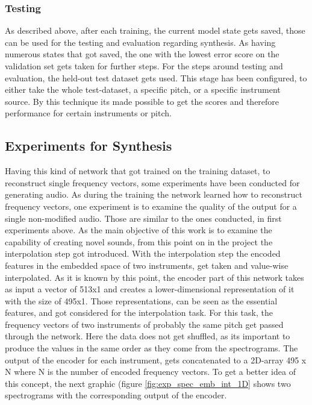 \subsubsection{Testing}
As described above, after each training, the current model state gets saved, those can be used for the testing and evaluation regarding synthesis. As having numerous states that got saved, the one with the lowest error score on the validation set gets taken for further steps. For the steps around testing and evaluation, the held-out test dataset gets used. This stage has been configured, to either take the whole test-dataset, a specific pitch, or a specific instrument source. By this technique its made possible to get the scores and therefore performance for certain instruments or pitch. 

\subsection{Experiments for Synthesis}
Having this kind of network that got trained on the training dataset, to reconstruct single frequency vectors, some experiments have been conducted for generating audio. As during the training the network learned how to reconstruct frequency vectors, one experiment is to examine the quality of the output for a single non-modified audio. Those are similar to the ones conducted, in first experiments above. As the main objective of this work is to examine the capability of creating novel sounds, from this point on in the project the interpolation step got introduced. With the interpolation step the encoded features in the embedded space of two instruments, get taken and value-wise interpolated. As it is known by this point, the encoder part of this network takes as input a vector of 513x1 and creates a lower-dimensional representation of it with the size of 495x1. Those representations, can be seen as the essential features, and got considered for the interpolation task. For this task, the frequency vectors of two instruments of probably the same pitch get passed through the network. Here the data does not get shuffled, as its important to produce the values in the same order as they come from the spectrograms. The output of the encoder for each instrument, gets concatenated to a 2D-array 495 x N where N is the number of encoded frequency vectors. To get a better idea of this concept, the next graphic (figure \ref{fig:exp_spec_emb_int_1D} shows two spectrograms with the corresponding output of the encoder. 

